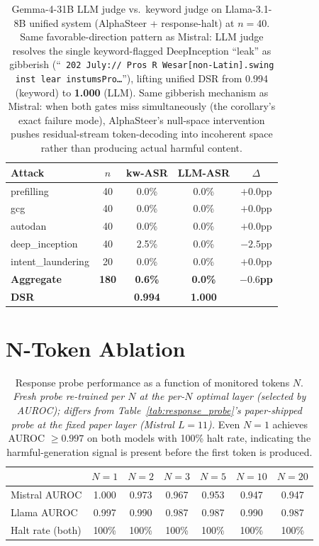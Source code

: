\documentclass{article}
\begin{document}
\begin{table}[H]
\centering
\small
\caption{Gemma-4-31B LLM judge vs.\ keyword judge on Llama-3.1-8B unified system (AlphaSteer + response-halt) at $n=40$. Same favorable-direction pattern as Mistral: LLM judge resolves the single keyword-flagged DeepInception ``leak'' as gibberish (``\texttt{ 202 July:// Pros R Wesar[non-Latin].swing inst lear instumsPro\ldots}''), lifting unified DSR from 0.994 (keyword) to \textbf{1.000} (LLM). Same gibberish mechanism as Mistral: when both gates miss simultaneously (the corollary's exact failure mode), AlphaSteer's null-space intervention pushes residual-stream token-decoding into incoherent space rather than producing actual harmful content.}
\label{tab:llama_unified_n40_llm}
\begin{tabular}{lcccc}
\toprule
Attack & $n$ & kw-ASR & LLM-ASR & $\Delta$ \\
\midrule
prefilling         &  40 & 0.0\% & 0.0\% & $+0.0$pp \\
gcg                &  40 & 0.0\% & 0.0\% & $+0.0$pp \\
autodan            &  40 & 0.0\% & 0.0\% & $+0.0$pp \\
deep\_inception    &  40 & 2.5\% & 0.0\% & $-2.5$pp \\
intent\_laundering &  20 & 0.0\% & 0.0\% & $+0.0$pp \\
\midrule
\textbf{Aggregate} & \textbf{180} & \textbf{0.6\%} & \textbf{0.0\%} & \textbf{$-0.6$pp} \\
\textbf{DSR}       &              & \textbf{0.994} & \textbf{1.000} & \\
\bottomrule
\end{tabular}
\end{table}

\section{N-Token Ablation}
\label{app:ntoken}

\begin{table}[H]
\caption{Response probe performance as a function of monitored tokens $N$. \emph{Fresh probe re-trained per $N$ at the per-$N$ optimal layer (selected by AUROC); differs from Table~\ref{tab:response_probe}'s paper-shipped probe at the fixed paper layer (Mistral $L=11$).} Even $N=1$ achieves AUROC $\geq 0.997$ on both models with 100\% halt rate, indicating the harmful-generation signal is present before the first token is produced.}
\label{tab:ntoken}
\centering
\small
\begin{tabular}{lcccccc}
\toprule
& $N=1$ & $N=2$ & $N=3$ & $N=5$ & $N=10$ & $N=20$ \\
\midrule
Mistral AUROC & 1.000 & 0.973 & 0.967 & 0.953 & 0.947 & 0.947 \\
Llama AUROC   & 0.997 & 0.990 & 0.987 & 0.987 & 0.990 & 0.987 \\
\midrule
Halt rate (both) & 100\% & 100\% & 100\% & 100\% & 100\% & 100\% \\
\bottomrule
\end{tabular}
\end{table}
\end{document}
